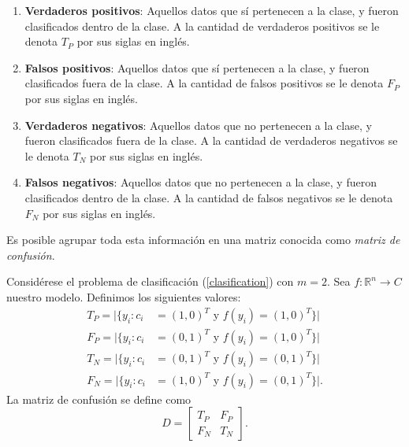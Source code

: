 \begin{enumerate}
    \item \textbf{Verdaderos positivos}: Aquellos datos que sí pertenecen a la clase, y fueron clasificados dentro de la clase. A la cantidad de verdaderos positivos se le denota $T_P$ por sus siglas en inglés.
    \item \textbf{Falsos positivos}: Aquellos datos que sí pertenecen a la clase, y fueron clasificados fuera de la clase. A la cantidad de falsos positivos se le denota $F_P$ por sus siglas en inglés.
    \item \textbf{Verdaderos negativos}: Aquellos datos que no pertenecen a la clase, y fueron clasificados fuera de la clase. A la cantidad de verdaderos negativos se le denota $T_N$ por sus siglas en inglés.
    \item \textbf{Falsos negativos}: Aquellos datos que no pertenecen a la clase, y fueron clasificados dentro de la clase. A la cantidad de falsos negativos se le denota $F_N$ por sus siglas en inglés.
\end{enumerate}
Es posible agrupar toda esta información en una matriz conocida como \textsl{matriz de confusión}. 
\begin{definition}
    \label{pos_neg}
    Considérese el problema de clasificación (\ref{clasification}) con $m = 2$. Sea $f: \mathbb R^n \to C$ nuestro modelo. Definimos los siguientes valores:
    \begin{align*}
        T_P = |\{y_i : c_i &= (1,0)^T \text{ y } f(y_i) = (1,0)^T\}| \\
        F_P = |\{y_i : c_i &= (0,1)^T \text{ y } f(y_i) = (1,0)^T\}| \\
        T_N = |\{y_i : c_i &= (0,1)^T \text{ y } f(y_i) = (0,1)^T\}| \\
        F_N = |\{y_i : c_i &= (1,0)^T \text{ y } f(y_i) = (0,1)^T\}|.
    \end{align*} 
    La matriz de confusión se define como 
    \begin{equation}
        D = \left[\begin{matrix}
            T_P & F_P \\
            F_N & T_N
        \end{matrix}\right].
    \end{equation}
\end{definition}
